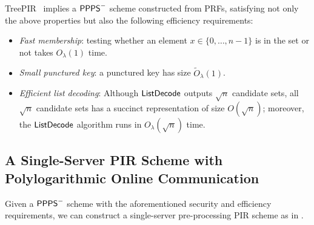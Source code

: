 TreePIR~\cite{treepir}
implies a ${\sf PPPS}^-$ scheme 
constructed from PRFs, 
satisfying not only the above properties but also the following efficiency requirements:
\begin{itemize}[leftmargin=5mm]
\item  
{\it Fast membership}: 
testing whether an element $x \in \{0, \ldots, n-1\}$ is
in the set or not takes 
$O_\lambda(1)$ time.
\item 
{\it Small punctured key}:
a punctured key has size $\widetilde{O}_\lambda(1)$.
\item 
{\it Efficient list decoding}: 
Although ${\sf ListDecode}$ outputs $\sqrt{n}$ candidate sets,
all $\sqrt{n}$ candidate sets has a succinct representation of size $O(\sqrt{n})$;
moreover, the 
${\sf ListDecode}$ algorithm runs in $O_\lambda(\sqrt{n})$ time.
\end{itemize}

\subsection{A Single-Server PIR Scheme with Polylogarithmic Online Communication}

Given a ${\sf PPPS}^-$ scheme with the aforementioned
security and efficiency requirements, we can construct a
single-server pre-processing PIR scheme as in %
.

